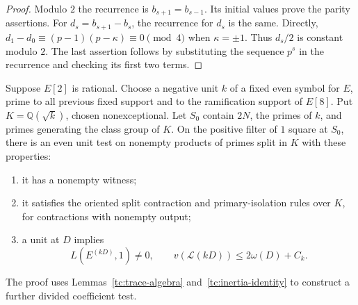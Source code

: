 \begin{proof}
Modulo $2$ the recurrence is $b_{s+1}=b_{s-1}$.  Its initial values prove
the parity assertions.  For $d_s=b_{s+1}-b_s$, the recurrence for $d_s$
is the same.  Directly,
$d_1-d_0\equiv(p-1)(p-\kappa)\equiv0\pmod4$ when $\kappa=\pm1$.
Thus $d_s/2$ is constant modulo $2$.  The last assertion follows by
substituting the sequence $p^s$ in the recurrence and checking its first
two terms.
\end{proof}

\begin{lemma}\label{pw:split-witness}
Suppose $E[2]$ is rational.  Choose a negative unit $k$ of a fixed even
symbol for $E$, prime to all previous fixed support and to the ramification
support of $E[8]$.  Put $K=\mathbb Q(\sqrt{k})$, chosen nonexceptional.
Let $S_0$ contain $2N$, the primes of $k$, and primes generating the class
group of $K$.  On the positive filter of $1$ square at $S_0$, there is an
even unit test on nonempty products of primes split in $K$ with these
properties:
\begin{enumerate}
\item it has a nonempty witness;
\item it satisfies the oriented split contraction and primary-isolation
rules over $K$, for contractions with nonempty output;
\item a unit at $D$ implies
\begin{equation}\label{pw:split-unit-bound}
 L(E^{(kD)},1)\ne0,\qquad v(\mathcal L(kD))\le 2\omega(D)+C_k.
\end{equation}
\end{enumerate}
The proof uses Lemmas~\ref{tc:trace-algebra} and~\ref{tc:inertia-identity}
to construct a further divided coefficient test.
\end{lemma}

